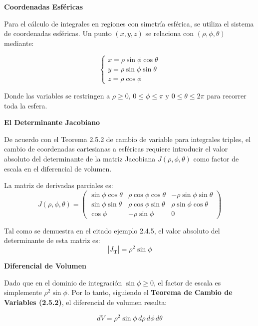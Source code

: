 \noindent\textbf{Coordenadas Esféricas}
\vspace{0.2cm}

Para el cálculo de integrales en regiones con simetría esférica, se utiliza el sistema de coordenadas esféricas. Un punto $(x, y, z)$ se relaciona con $(\rho, \phi, \theta)$ mediante:

\begin{equation}
    \begin{cases}
        x = \rho \sin \phi \cos \theta \\
        y = \rho \sin \phi \sin \theta \\
        z = \rho \cos \phi
    \end{cases}
\end{equation}

Donde las variables se restringen a $\rho \ge 0$, $0 \le \phi \le \pi$ y $0 \le \theta \le 2\pi$ para recorrer toda la esfera.

\vspace{0.4cm}
\noindent\textbf{El Determinante Jacobiano}

De acuerdo con el Teorema 2.5.2 de cambio de variable para integrales triples, el cambio de coordenadas cartesianas a esféricas requiere introducir el valor absoluto del determinante de la matriz Jacobiana $J(\rho, \phi, \theta)$ como factor de escala en el diferencial de volumen.

La matriz de derivadas parciales es:
\begin{equation}
J(\rho, \phi, \theta) = 
\begin{pmatrix}
\sin \phi \cos \theta & \rho \cos \phi \cos \theta & -\rho \sin \phi \sin \theta \\
\sin \phi \sin \theta & \rho \cos \phi \sin \theta & \rho \sin \phi \cos \theta \\
\cos \phi & -\rho \sin \phi & 0
\end{pmatrix}
\end{equation}

Tal como se demuestra en el citado ejemplo 2.4.5, el valor absoluto del determinante de esta matriz es:
\begin{equation}
    \left| J_{\mathbf{T}} \right| = \rho^2 \sin \phi
\end{equation}

\vspace{0.4cm}
\noindent\textbf{Diferencial de Volumen}

Dado que en el dominio de integración $\sin \phi \ge 0$, el factor de escala es simplemente $\rho^2 \sin \phi$. Por lo tanto, siguiendo el \textbf{Teorema de Cambio de Variables (2.5.2)}, el diferencial de volumen resulta:

\begin{equation}
    dV = \rho^2 \sin \phi \, d\rho \, d\phi \, d\theta
\end{equation}


\vspace{1cm}
